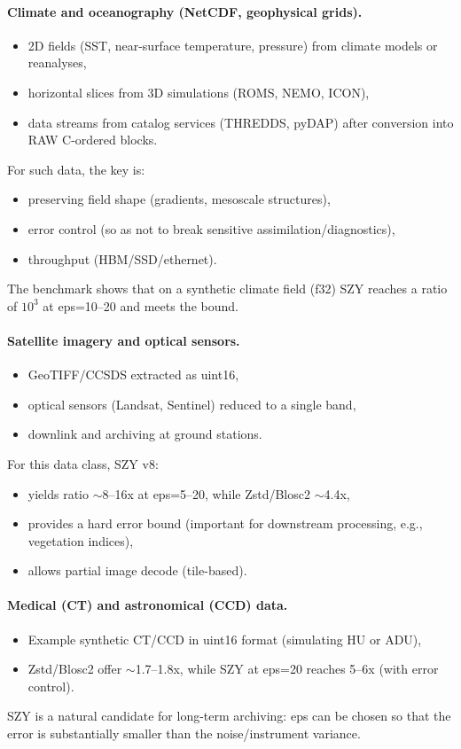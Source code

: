 \documentclass[11pt,a4paper]{article}
\begin{document}
\paragraph{Climate and oceanography (NetCDF, geophysical grids).}
\begin{itemize}
  \item 2D fields (SST, near-surface temperature, pressure) from climate models or reanalyses,
  \item horizontal slices from 3D simulations (ROMS, NEMO, ICON),
  \item data streams from catalog services (THREDDS, pyDAP) after conversion into RAW C-ordered blocks.
\end{itemize}
For such data, the key is:
\begin{itemize}
  \item preserving field shape (gradients, mesoscale structures),
  \item error control (so as not to break sensitive assimilation/diagnostics),
  \item throughput (HBM/SSD/ethernet).
\end{itemize}
The benchmark shows that on a synthetic climate field (f32) SZY reaches a ratio of $10^3$ at eps=10--20 and meets the bound.

\paragraph{Satellite imagery and optical sensors.}
\begin{itemize}
  \item GeoTIFF/CCSDS extracted as uint16,
  \item optical sensors (Landsat, Sentinel) reduced to a single band,
  \item downlink and archiving at ground stations.
\end{itemize}
For this data class, SZY v8:
\begin{itemize}
  \item yields ratio $\sim$8--16x at eps=5--20, while Zstd/Blosc2 $\sim$4.4x,
  \item provides a hard error bound (important for downstream processing, e.g., vegetation indices),
  \item allows partial image decode (tile-based).
\end{itemize}

\paragraph{Medical (CT) and astronomical (CCD) data.}
\begin{itemize}
  \item Example synthetic CT/CCD in uint16 format (simulating HU or ADU),
  \item Zstd/Blosc2 offer $\sim$1.7--1.8x, while SZY at eps=20 reaches 5--6x (with error control).
\end{itemize}
SZY is a natural candidate for long-term archiving: eps can be chosen so that the error is substantially smaller than the noise/instrument variance.
\end{document}

